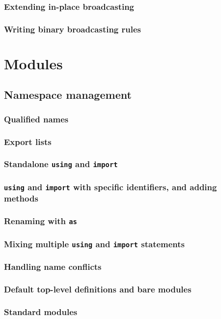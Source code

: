     \subsection{Extending in-place broadcasting}
    \subsection{Writing binary broadcasting rules}
  \chapter{Modules}
    \section{Namespace management}
    \subsection{Qualified names}
    \subsection{Export lists}
    \subsection{Standalone \texttt{using} and \texttt{import}}
    \subsection{\texttt{using} and \texttt{import} with specific identifiers, and adding methods}
    \subsection{Renaming with \texttt{as}}
    \subsection{Mixing multiple \texttt{using} and \texttt{import} statements}
    \subsection{Handling name conflicts}
    \subsection{Default top-level definitions and bare modules}
    \subsection{Standard modules}
